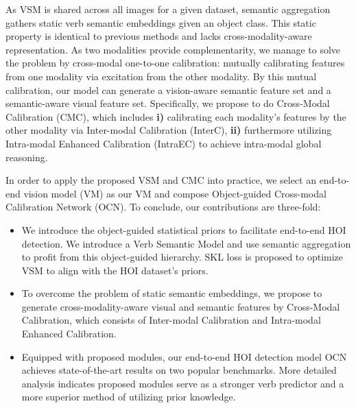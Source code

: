 \documentclass[letterpaper]{article} \usepackage{aaai22}  \usepackage{times}  \usepackage{helvet}  \usepackage{courier}  \usepackage[hyphens]{url}  \usepackage{graphicx} \urlstyle{rm} \def\UrlFont{\rm}  \usepackage{natbib}  \usepackage{caption} \DeclareCaptionStyle{ruled}{labelfont=normalfont,labelsep=colon,strut=off} \frenchspacing  \setlength{\pdfpagewidth}{8.5in}  \setlength{\pdfpageheight}{11in}  \usepackage{algorithm}
\begin{document}
As VSM is shared across all images for a given dataset, semantic aggregation gathers static verb semantic embeddings given an object class. This static property is identical to previous methods \cite{liu2020FCMFNet} and lacks cross-modality-aware representation. As two modalities provide complementarity, we manage to solve the problem by cross-modal one-to-one calibration: mutually calibrating features from one modality via excitation from the other modality. By this mutual calibration, our model can generate a vision-aware semantic feature set and a semantic-aware visual feature set. Specifically, we propose to do Cross-Modal Calibration (CMC), which includes \textbf{i)} calibrating each modality's features by the other modality via Inter-modal Calibration (InterC), \textbf{ii)} furthermore utilizing Intra-modal Enhanced Calibration (IntraEC) \cite{AttentionAlluNeed,lin2020gps} to achieve intra-modal global reasoning. 






In order to apply the proposed VSM and CMC into practice, we select an end-to-end vision model (VM) \cite{zou2021HOITransformer,tamura2021qpic} as our VM and compose Object-guided Cross-modal Calibration Network (OCN). To conclude, our contributions are three-fold:
\begin{itemize}
    \item We introduce the object-guided statistical priors to facilitate end-to-end HOI detection. We introduce a Verb Semantic Model and use semantic aggregation to profit from this object-guided hierarchy. SKL loss is proposed to optimize VSM to align with the HOI dataset’s priors.
    
    \item To overcome the problem of static semantic embeddings, we propose to generate cross-modality-aware visual and semantic features by Cross-Modal Calibration, which consists of Inter-modal Calibration and Intra-modal Enhanced Calibration.
    


    \item Equipped with proposed modules, our end-to-end HOI detection model OCN achieves state-of-the-art results on two popular benchmarks. More detailed analysis indicates proposed modules serve as a stronger verb predictor and a more superior method of utilizing prior knowledge.
    




\end{itemize}
\end{document}
